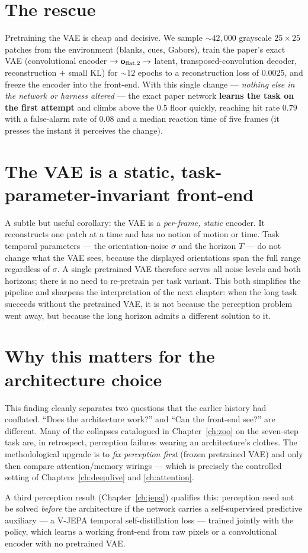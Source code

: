 \section{The rescue}
Pretraining the VAE is cheap and decisive. We sample $\sim\!42{,}000$ grayscale
$25\times25$ patches from the environment (blanks, cues, Gabors), train the paper's exact
VAE (convolutional encoder $\to\mathbf{o}_{\text{flat,2}}\to$ latent, transposed-convolution decoder,
reconstruction $+$ small KL) for $\sim\!12$ epochs to a reconstruction loss of $0.0025$,
and freeze the encoder into the front-end. With this single change --- \emph{nothing else
in the network or harness altered} --- the exact paper network \textbf{learns the task on
the first attempt} and climbs above the $0.5$ floor quickly, reaching hit rate $0.79$ with
a false-alarm rate of $0.08$ and a median reaction time of five frames (it presses the
instant it perceives the change).

\section{The VAE is a static, task-parameter-invariant front-end}
A subtle but useful corollary: the VAE is a \emph{per-frame, static} encoder. It
reconstructs one patch at a time and has no notion of motion or time. Task temporal
parameters --- the orientation-noise $\sigma$ and the horizon $T$ --- do not change what the
VAE sees, because the displayed orientations span the full range regardless of $\sigma$.
A single pretrained VAE therefore serves all noise levels and both horizons; there is no
need to re-pretrain per task variant. This both simplifies the pipeline and sharpens the
interpretation of the next chapter: when the long task succeeds without the pretrained VAE,
it is not because the perception problem went away, but because the long horizon admits a
different solution to it.

\section{Why this matters for the architecture choice}
This finding cleanly separates two questions that the earlier history had conflated.
``Does the architecture work?'' and ``Can the front-end see?'' are different. Many of the
collapses catalogued in Chapter~\ref{ch:zoo} on the seven-step task are, in retrospect,
perception failures wearing an architecture's clothes. The methodological upgrade is to
\emph{fix perception first} (frozen pretrained VAE) and only then compare attention/memory
wirings --- which is precisely the controlled setting of Chapters~\ref{ch:deepdive} and
\ref{ch:attention}.

A third perception result (Chapter~\ref{ch:jepa}) qualifies this: perception need not be
solved \emph{before} the architecture if the network carries a self-supervised predictive
auxiliary --- a V-JEPA temporal self-distillation loss --- trained jointly with the policy,
which learns a working front-end from raw pixels or a convolutional encoder with no
pretrained VAE.
